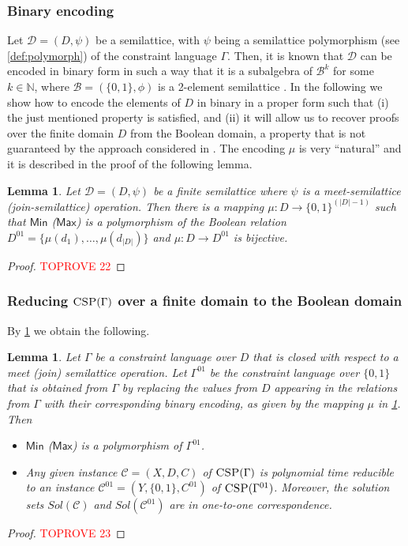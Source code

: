 \documentclass[11pt]{article}
\newcommand{\Cc}{\mathcal{C}}
\newcommand{\CSP}{\textsc{CSP}}
\newcommand{\Max}{\textsf{Max}}
\newcommand{\Min}{\textsf{Min}}
\newcommand{\1}{\textbf{1}}
\newcommand\uval{{(|D|-1)}}
\newtheorem{lemma}[theorem]{Lemma}
\begin{document}
\subsubsection{Binary encoding}\label{sect:binencoding}
{Let} $\mathcal{D} = (D,\psi)$ {be} a semilattice{, with} $\psi$ {being} a semilattice polymorphism (see \cref{def:polymorph}) of the constraint language $\Gamma$.
Then, it is known that $\mathcal{D}$ can be encoded in binary form in such a way that it is a subalgebra of $\mathcal{B}^k$ {for some $k \in \mathbb{N}$}, where $\mathcal{B} = (\{0, 1\}, \phi)$ is a 2-element semilattice \cite{DonaPapert1964}.
In the following we show how to encode the elements of $D$ in binary in a proper form such that (i) the just mentioned property \cite{DonaPapert1964} is satisfied, and (ii) it will allow us to recover proofs {over the finite domain $D$} from the Boolean domain, a property that is not guaranteed by the approach considered in \cite{BulatovRSTOC22}.
The encoding $\mu$ is very ``natural'' and it is described in the proof of the following lemma.\begin{lemma}\label{th:bin_encoding}
    Let $\mathcal{D} = (D,\psi)$ be a finite semilattice where $\psi$ is a meet-semilattice (join-semilattice) operation. Then there is a mapping $\mu:D\rightarrow \{0,1\}^{\uval}$ such that $\Min$ ($\Max$) is a polymorphism of {the Boolean relation} $D^{01}=\{\mu(d_1),\ldots,\mu(d_{|D|})\}$ and $\mu:D\rightarrow D^{01}$ is bijective.
\end{lemma}
\begin{proof}\textcolor{red}{TOPROVE 22}\end{proof}





\subsubsection[Reducing CSP(Gamma) over a finite domain to the Boolean domain]{Reducing $\CSP(\Gamma)$ over a finite domain to the Boolean domain}\label{sect:mapping2bool}
By \cref{th:bin_encoding} we obtain the following.

\begin{lemma}\label{th:reduction_csp}
Let $\Gamma$ be a constraint language over $D$ that is closed with respect to a meet (join) semilattice operation. Let $\Gamma^{01}$ be the constraint language over $\{0,1\}$ that is obtained from $\Gamma$ by replacing the values from $D$ appearing in the relations from $\Gamma$ with their corresponding binary encoding, as given by the mapping $\mu$ in \cref{th:bin_encoding}. Then 
\begin{itemize}
    \item $\Min$ ($\Max$) is a polymorphism of $\Gamma^{01}$.
    \item Any given instance $\Cc=(X,D,C)$ of $\CSP(\Gamma)$ is polynomial time reducible to an instance $\Cc^{01}=(Y,\{0,1\},C^{01})$ of $\CSP(\Gamma^{01})$. Moreover, the solution sets $Sol(\Cc)$ and $Sol(\Cc^{01})$ are in one-to-one correspondence.  
\end{itemize} 
\end{lemma}
\begin{proof}\textcolor{red}{TOPROVE 23}\end{proof}
\end{document}
